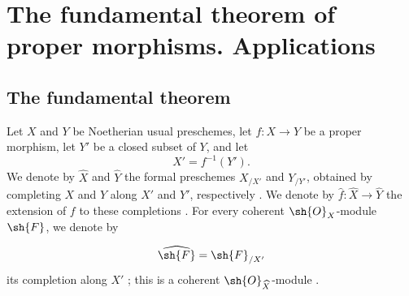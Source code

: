 \section{The fundamental theorem of proper morphisms. Applications}
\label{section:III.4}


\subsection{The fundamental theorem}
\label{subsection:III.4.1}

\begin{env}[4.1.1]
\label{III.4.1.1}
Let $X$ and $Y$ be Noetherian usual preschemes, let $f:X\to Y$ be a
proper morphism, let $Y'$ be a closed subset of $Y$, and let
\[
  X'=f^{-1}(Y').
\]
We denote by $\widehat{X}$ and $\widehat{Y}$ the formal preschemes
$X_{/X'}$ and $Y_{/Y'}$, obtained by completing $X$ and $Y$ along
$X'$ and $Y'$, respectively .
We denote by $\widehat{f}:\widehat{X}\to\widehat{Y}$ the extension of
$f$ to these completions .
For every coherent $\sh{O}_X$-module $\sh{F}$, we denote by


\[
  \widehat{\sh{F}}=\sh{F}_{/X'}
\]
its completion along $X'$ ; this is a coherent
$\sh{O}_{\widehat{X}}$-module .
\end{env}

